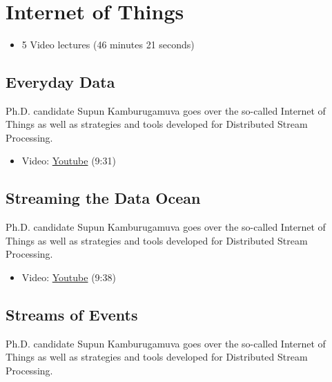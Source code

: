 
\FILENAME\

\section{Internet of Things}\label{internet-of-things}

\begin{itemize}

\item
  5 Video lectures (46 minutes 21 seconds)
\end{itemize}

\subsection{Everyday Data}\label{everyday-data}

Ph.D. candidate Supun Kamburugamuva goes over the so-called Internet of
Things as well as strategies and tools developed for Distributed Stream
Processing.

\begin{itemize}

\item
  Video:
  \href{https://www.youtube.com/watch?time_continue=9\&v=brv48Tg7Zyw}{Youtube}
  (9:31)
\end{itemize}

\subsection{Streaming the Data Ocean}\label{streaming-the-data-ocean}

Ph.D. candidate Supun Kamburugamuva goes over the so-called Internet of
Things as well as strategies and tools developed for Distributed Stream
Processing.

\begin{itemize}

\item
  Video: \href{https://www.youtube.com/watch?v=hTbveHCjAo4}{Youtube}
  (9:38)
\end{itemize}

\subsection{Streams of Events}\label{streams-of-events}

Ph.D. candidate Supun Kamburugamuva goes over the so-called Internet of
Things as well as strategies and tools developed for Distributed Stream
Processing.

